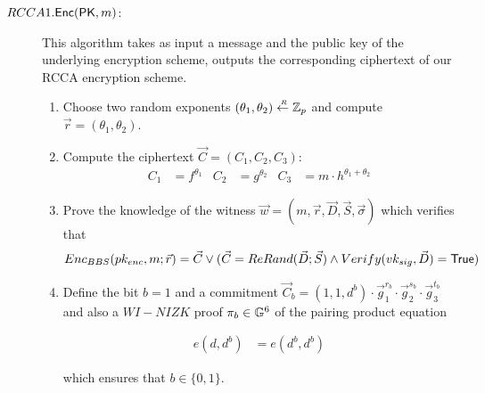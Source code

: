 \begin{description}
\item[\boldmath$RCCA1.{\mathsf{Enc}}(\mathsf{PK},m)$:] This algorithm takes as input a message and the public key of the underlying encryption scheme, outputs the corresponding ciphertext of our RCCA encryption scheme.
  \begin{enumerate}
  \item Choose two random exponents $(\theta_1, \theta_2) \stackrel{{\scriptscriptstyle \mkern4mu R}}{\gets} \mathbb{Z}_p$ and compute $ \vec{r} = (\theta_1, \theta_2)$.
  \item Compute the ciphertext $\vec{C} = (C_1, C_2, C_3)$:
    \begin{align*}
      C_1 &= f^{\theta_1} & C_2 &= g^{\theta_2} & C_3 &= m \cdot h^{\theta_1+\theta_2}
    \end{align*}

  \item Prove the knowledge of the witness $\vec{w} = (m, \vec{r}, \vec{D}, \vec{S}, \vec{\sigma})$ which verifies that
    \begin{align*}
      Enc_{BBS}(pk_{enc}, m; \vec{r}) = \vec{C} \vee (\vec{C} = ReRand(\vec{D}; \vec{S}) \wedge Verify(vk_{sig}, \vec{D}) = \mathsf{True})
    \end{align*}
    
  \item Define the bit $b = 1$ and a commitment $\vec{C}_b = (1,1,d^b)\cdot \vec{g}_1^{r_b} \cdot \vec{g}_2^{s_b} \cdot \vec{g}_3^{t_b}$ and also a $WI-NIZK$ proof $\pi_b \in \mathbb{G}^6$ of the pairing product equation 
  
  \begin{align}
  e(d,\boxed{d^b}) &= e(\boxed{d^b},\boxed{d^b}) \tag{1}
  \end{align}
  
  which ensures that $b \in \{0,1\}$.


\end{enumerate}
\end{description}
